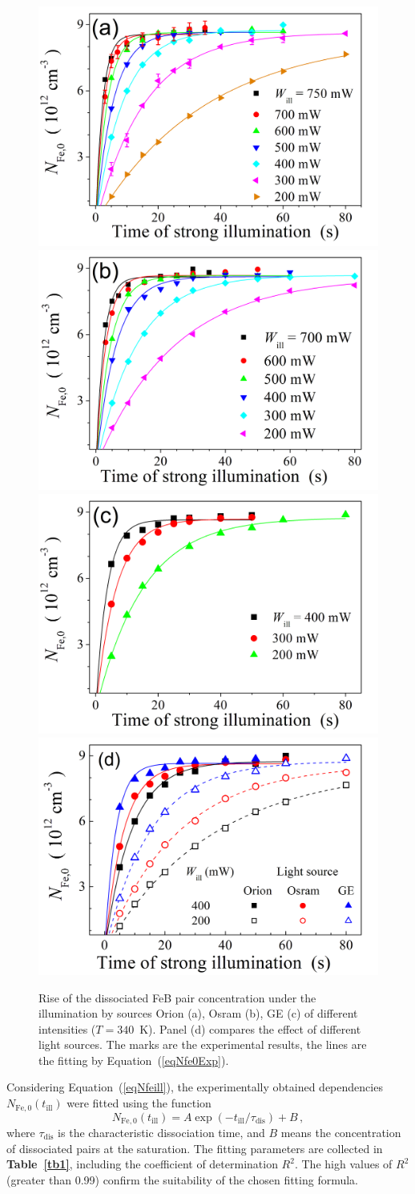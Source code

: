 \documentclass{WileyMSP-template}
\begin{document}
\begin{figure}
\centering
  \includegraphics[width=0.4\linewidth]{Fig3a.png}
  \includegraphics[width=0.4\linewidth]{Fig3b.png}
  \includegraphics[width=0.4\linewidth]{Fig3c.png}
  \includegraphics[width=0.4\linewidth]{Fig3d.png}
  \caption{Rise of the dissociated FeB pair concentration under the illumination by sources Orion (a), Osram (b), GE (c) of different intensities ($T=340$~K).
  Panel (d) compares the effect of different light sources.
  The marks are the experimental results, the lines are the fitting by Equation~(\ref{eqNfe0Exp}).
   }
  \label{fig3}
\end{figure}


Considering Equation~(\ref{eqNfeill}), the experimentally obtained dependencies $N_\mathrm{Fe,0}(t_\mathrm{ill})$ were fitted using the function
\begin{equation}
\label{eqNfe0Exp}
N_\mathrm{Fe,0}(t_\mathrm{ill})=A\exp(-t_\mathrm{ill}/\tau_\mathrm{dis})
+B\,,
\end{equation}
where
$\tau_\mathrm{dis}$ is the characteristic dissociation time,
and $B$ means the concentration of dissociated pairs at the saturation.
The fitting parameters are collected in \textbf{Table~\ref{tb1}},
including the coefficient of determination $R^2$.
The high values of $R^2$ (greater than 0.99) confirm the suitability of the chosen fitting formula.
\end{document}
